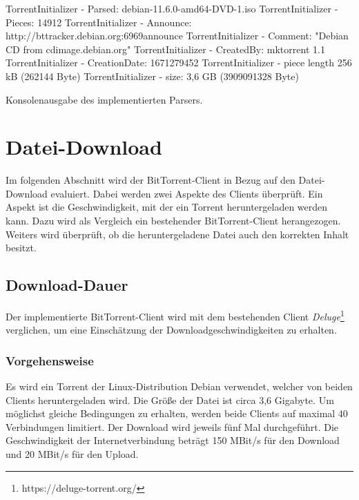 \begin{program}
    \begin{GenericCode}[numbers=none]
TorrentInitializer - Parsed:       	debian-11.6.0-amd64-DVD-1.iso
TorrentInitializer - Pieces:       	14912
TorrentInitializer - Announce:     	http://bttracker.debian.org:6969announce
TorrentInitializer - Comment:      	"Debian CD from cdimage.debian.org"
TorrentInitializer - CreatedBy:    	mktorrent 1.1
TorrentInitializer - CreationDate: 	1671279452
TorrentInitializer - piece length  	256 kB (262144 Byte)
TorrentInitializer - size:         	3,6 GB (3909091328 Byte)
\end{GenericCode}
\caption{Konsolenausgabe des implementierten Parsers.}
\label{prog:ImplementedParserResult}
\end{program}

\section{Datei-Download}

Im folgenden Abschnitt wird der BitTorrent-Client in Bezug auf den Datei-Down\-load evaluiert. Dabei werden zwei Aspekte des Clients überprüft. Ein Aspekt ist die Geschwindigkeit, mit der ein Torrent heruntergeladen werden kann. Dazu wird als Vergleich ein bestehender BitTorrent-Client herangezogen. Weiters wird überprüft, ob die heruntergeladene Datei auch den korrekten Inhalt besitzt. 

\subsection{Download-Dauer}

Der implementierte BitTorrent-Client wird mit dem bestehenden Client \emph{Deluge}\footnote[1]{https://deluge-torrent.org/} verglichen, um eine Einschätzung der Downloadgeschwindigkeiten zu erhalten. 

\subsubsection{Vorgehensweise}
Es wird ein Torrent der Linux-Distribution Debian verwendet, welcher von beiden Clients heruntergeladen wird. Die Größe der Datei ist circa 3,6 Gigabyte. Um möglichst gleiche Bedingungen zu erhalten, werden beide Clients auf maximal 40 Verbindungen limitiert. Der Download wird jeweils fünf Mal durchgeführt. Die Geschwindigkeit der Internetverbindung beträgt 150 MBit/s für den Download und 20 MBit/s für den Upload.

